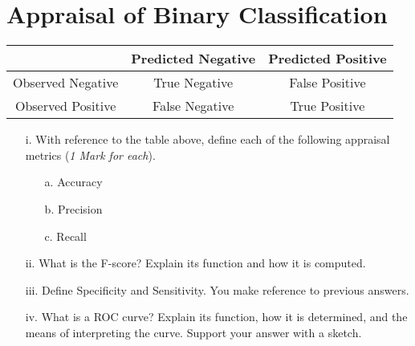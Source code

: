 \documentclass[a4paper,12pt]{article}
\begin{document}
	\section*{Appraisal of Binary Classification}
	
	\begin{center}
		\begin{tabular}{|c|c|c|}
			\hline  & Predicted Negative & Predicted Positive \\ 
			\hline Observed Negative & True Negative & False Positive \\ 
			\hline Observed Positive & False Negative & True Positive \\ 
			\hline 
		\end{tabular} 
	\end{center}
	\begin{itemize}
		\item[i.] With reference to the table above, define each of the following appraisal metrics (\textit{1 Mark for each}).
		\begin{itemize}
			\item[a.] Accuracy
			\item[b.] Precision
			\item[c.] Recall
		\end{itemize}
		\item[ii.] What is the F-score? Explain its function and how it is computed.
		\item[iii.] Define Specificity and Sensitivity. You make reference to previous answers.
		\item[iv.] What is a ROC curve? Explain its function, how it is determined, and the means of interpreting the curve. Support your answer with a sketch.
	\end{itemize}
	
\end{document}

